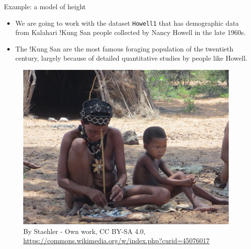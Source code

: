 \documentclass[handout]{beamer}
\begin{document}
\begin{frame}[fragile]{Example: a model of height}
\scriptsize{
\begin{itemize}
 \item  We are going to work with the dataset \verb+Howell1+ that has demographic data from Kalahari !Kung San people collected by Nancy Howell in the late 1960s. 
 \item The !Kung San are the most famous foraging population of the twentieth century, largely because of detailed quantitative studies by people like Howell. \cite{mcelreath2020statistical}
 \end{itemize} 

 
 \begin{figure}[h!]
	\centering
	\includegraphics[scale=0.6]{pics/San_Schmuck.jpg}
	\caption{By Staehler - Own work, CC BY-SA 4.0, \url{https://commons.wikimedia.org/w/index.php?curid=45076017}}
\end{figure}

 
}
\end{frame}
\end{document}
